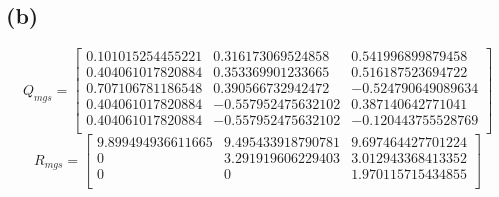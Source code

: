 \documentclass{article}
\begin{document}
        \subsection*{(b)}
            \begin{equation*}
                Q_{mgs} = \left[
                \begin{array}{ccc}
                    0.101015254455221 &  0.316173069524858 &  0.541996899879458\\
                    0.404061017820884 &  0.353369901233665 &  0.516187523694722\\
                    0.707106781186548 &  0.390566732942472 & -0.524790649089634\\
                    0.404061017820884 & -0.557952475632102 &  0.387140642771041\\
                    0.404061017820884 & -0.557952475632102 & -0.120443755528769\\
                \end{array}
                \right]
            \end{equation*}
            \begin{equation*}
                R_{mgs} = \left[    
                \begin{array}{ccc}
                    9.899494936611665 &  9.495433918790781 &  9.697464427701224\\
                    0 &  3.291919606229403 &  3.012943368413352\\
                    0 &                  0 &  1.970115715434855\\
                \end{array}
                \right]
            \end{equation*}
\end{document}
